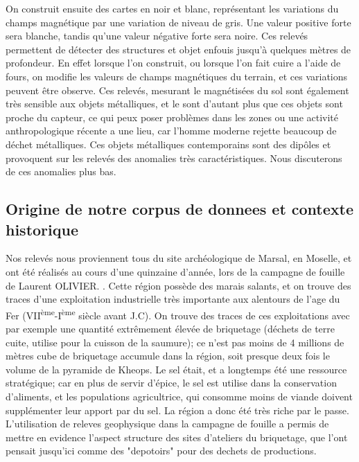 \documentclass[a4paper, 12pt, titlepage, oneside, french]{article}
\begin{document}
	On construit ensuite des cartes en noir et blanc, représentant les variations du champs magnétique par une variation de niveau de gris. Une valeur positive forte sera blanche, tandis qu'une valeur négative forte sera noire. Ces relevés permettent de détecter des structures et objet enfouis jusqu'à quelques mètres de profondeur. En effet lorsque l'on construit, ou lorsque l'on fait cuire a l'aide de fours, on modifie les valeurs de champs magnétiques du terrain, et ces variations peuvent être observe. Ces relevés, mesurant le magnétisées du sol sont également très sensible aux objets métalliques, et le sont d'autant plus que ces objets sont proche du capteur, ce qui peux poser problèmes dans les zones ou une activité anthropologique récente a une lieu, car l'homme moderne rejette beaucoup de déchet métalliques. Ces objets métalliques contemporains sont des dipôles et provoquent sur les relevés des anomalies très caractéristiques. Nous discuterons de ces anomalies plus bas.

	\subsection{Origine de notre corpus de donnees et contexte historique}

	Nos relevés nous proviennent tous du site archéologique de Marsal, en Moselle, et ont été réalisés au cours d'une quinzaine d'année, lors de la campagne de fouille de Laurent OLIVIER.%
	. Cette région possède des marais salants, et on trouve des traces d'une exploitation industrielle très importante aux alentours de l'age du Fer (VII\textsuperscript{ème}-I\textsuperscript{ème} siècle avant J.C). On trouve des traces de ces exploitations avec par exemple une quantité extrêmement élevée de briquetage (déchets de terre cuite, utilise pour la cuisson de la saumure); ce n'est pas moins de 4 millions de mètres cube de briquetage accumule dans la région, soit presque deux fois le volume de la pyramide de Kheops. Le sel était, et a longtemps été une ressource stratégique; car en plus de servir d'épice, le sel est utilise dans la conservation d'aliments, et les populations agricultrice, qui consomme moins de viande doivent supplémenter leur apport par du sel. La région a donc été très riche par le passe. 
	L'utilisation de releves geophysique dans la campagne de fouille a permis de mettre en evidence l'aspect structure des sites d'ateliers du briquetage, que l'ont pensait jusqu'ici comme des "depotoirs" pour des dechets de productions.  
\end{document}
